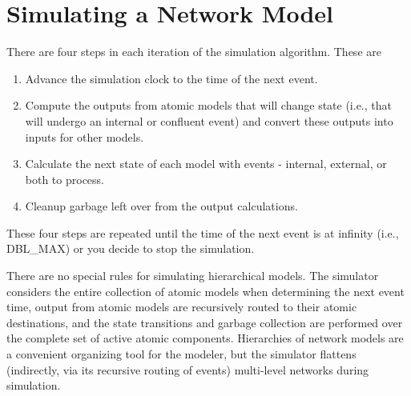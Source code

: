 \section{Simulating a Network Model}
There are four steps in each iteration of the simulation algorithm. These are
\begin{enumerate}
\item Advance the simulation clock to the time of the next event.
\item Compute the outputs from atomic models that will change state (i.e., that will undergo an internal or confluent event) and convert these outputs into inputs for other models.
\item Calculate the next state of each model with events - internal, external, or both to process.
\item Cleanup garbage left over from the output calculations.
\end{enumerate}
These four steps are repeated until the time of the next event is at infinity (i.e., DBL\_MAX) or you decide to stop the simulation.

There are no special rules for simulating hierarchical models. The simulator considers the entire collection of atomic models when determining the next event time, output from atomic models are recursively routed to their atomic destinations, and the state transitions and garbage collection are performed over the complete set of active atomic components. Hierarchies of network models are a convenient organizing tool for the modeler, but the simulator flattens (indirectly, via its recursive routing of events) multi-level networks during simulation.

